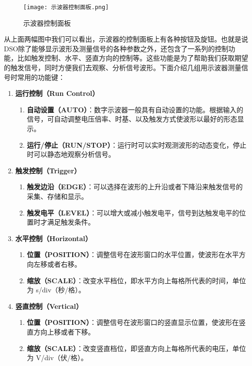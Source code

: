 \documentclass[lang=cn,a4paper,newtx]{elegantpaper}
\begin{document}
  \begin{figure}[!htb]
 	\centering
 	\caption{示波器控制面板}
 	\label{示波器控制面板}
 	\texttt{[image: 示波器控制面板.png]}
 \end{figure}

从上面两幅图中我们可以看出，示波器的控制面板上有各种按钮及旋钮。也就是说DSO除了能够显示波形及测量信号的各种参数之外，还包含了一系列的控制功能，比如触发控制、水平、竖直方向的控制等。这些功能是为了帮助我们获取期望的触发信号，同时方便我们去观察、分析信号波形。下面介绍几组用示波器测量信号时常用的功能键：

 \begin{enumerate}[label=(\arabic*)]
 	\item \textbf{运行控制（Run Control）}
 	\begin{enumerate}[label=\protect\ding{\numexpr171+\arabic*}]
 		\item \textbf{自动设置（AUTO）}：数字示波器一般具有自动设置的功能。根据输入的信号，可自动调整电压倍率、时基、以及触发方式使波形以最好的形态显示。
 		\item \textbf{运行/停止（RUN/STOP）}：运行时可以实时观测波形的动态变化，停止时可以静态地观察分析信号。
 	\end{enumerate}
 	\item \textbf{触发控制（Trigger）}
 	\begin{enumerate}[label=\protect\ding{\numexpr171+\arabic*}]
 		\item \textbf{触发边沿（EDGE）}：可以选择在波形的上升沿或者下降沿来触发信号的采集、存储和显示。
 		\item \textbf{触发电平（LEVEL）}：可以增大或减小触发电平，信号到达触发电平的位置时才满足触发条件。
 	\end{enumerate}
 	\item \textbf{水平控制（Horizontal）}
 	\begin{enumerate}[label=\protect\ding{\numexpr171+\arabic*}]
 		\item \textbf{位置（POSITION）}：调整信号在波形窗口的水平位置，使波形在水平方向左移或者右移。
 		\item \textbf{缩放（SCALE）}：改变水平档位，即水平方向上每格所代表的时间，单位为 s/div（秒/格）。
 	\end{enumerate}
 	\item \textbf{竖直控制（Vertical）}
 	\begin{enumerate}[label=\protect\ding{\numexpr171+\arabic*}]
 		\item \textbf{位置（POSITION）}：调整信号在波形窗口的竖直显示位置，使波形在竖直方向上移或者下移。
 		\item \textbf{缩放（SCALE）}：改变竖直档位，即竖直方向上每格所代表的电压，单位为 V/div（伏/格）。
 	\end{enumerate}
 \end{enumerate}
	
\end{document}
